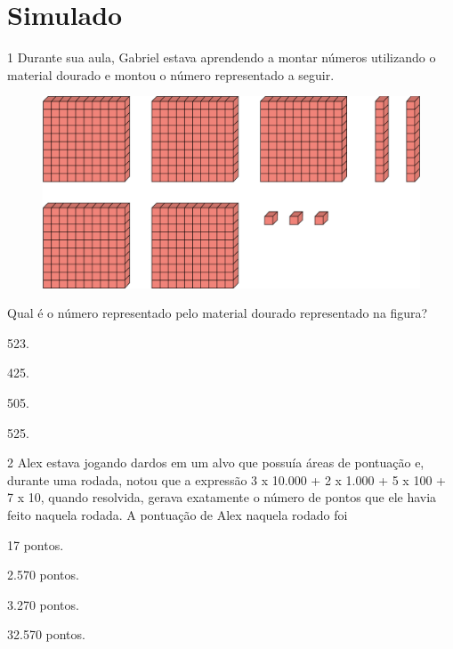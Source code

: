 \setcounter{chapter}{0}
\chapter[Simulado 1]{Simulado}

\num{1} Durante sua aula, Gabriel estava aprendendo a montar números utilizando o
material dourado e montou o número representado a seguir.

\begin{figure}[htpb!]
\centering
\includegraphics[width=\textwidth]{media/image76.png}
\end{figure}


Qual é o número representado pelo material dourado representado na figura?

\begin{escolha}
\item
  523.
\item
  425.
\item
  505.
\item
  525.
\end{escolha}


\num{2} Alex estava jogando dardos em um alvo que possuía áreas de pontuação e,
durante uma rodada, notou que a expressão 3 x 10.000 + 2 x 1.000 + 5 x
100 + 7 x 10, quando resolvida, gerava exatamente o número de pontos que
ele havia feito naquela rodada. A pontuação de Alex naquela rodado foi

\begin{escolha}
\item
  17 pontos.
\item
  2.570 pontos.
\item
  3.270 pontos.
\item
  32.570 pontos.
\end{escolha}

